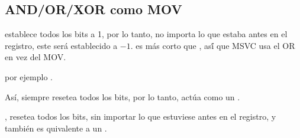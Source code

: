 
\subsection{AND/OR/XOR como MOV}

 establece todos los bits a 1, por lo tanto, no importa lo que estaba antes en el registro, este ser\'a establecido a $-1$.
 es m\'as corto que , as\'í que MSVC usa el OR en vez del MOV.

por ejemplo .

As\'i,  siempre resetea todos los bits, por lo tanto, act\'ua como un .

, resetea todos los bits, sin importar lo que estuviese antes en el registro, y tambi\'en es quivalente a un .
